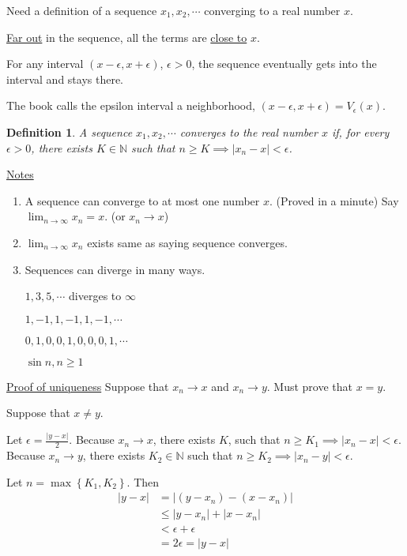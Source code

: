 \documentclass[12pt]{article}
\newtheorem*{definition}{Definition}
\begin{document}
Need a definition of a sequence $x_1, x_2, \cdots$ converging to a real number $x$.

\underline{Far out} in the sequence, all the terms are \underline{close to} $x$.

For any interval $(x - \epsilon, x + \epsilon)$, $\epsilon > 0$, the sequence eventually gets into the interval and stays there.

The book calls the epsilon interval a neighborhood, $\left(x - \epsilon, x + \epsilon \right) = V_\epsilon\left(x\right)$.

\begin{definition}
A sequence $x_1, x_2, \cdots$ converges to the real number $x$ if, for every $\epsilon > 0$, there exists $K \in \mathbb{N}$ such that $n \geq K \implies \left|x_n - x\right| < \epsilon$.
\end{definition}

\underline{Notes}
\begin{enumerate}
\item A sequence can converge to at most one number $x$. (Proved in a minute) Say $\lim_{n \to \infty} x_n = x$. (or $x_n \rightarrow x$)

\item $\lim_{n \to \infty} x_n$ exists same as saying sequence converges.

\item Sequences can diverge in many ways.

$1, 3, 5, \cdots$ diverges to $\infty$

$1, -1, 1, -1, 1, -1, \cdots$

$0, 1, 0, 0, 1, 0, 0, 0, 1, \cdots$

$\sin n, n \geq 1$
\end{enumerate}

\underline{Proof of uniqueness} Suppose that $x_n \to x$ and $x_n \rightarrow y$. Must prove that $x = y$.

Suppose that $x \neq y$.

Let $\epsilon = \frac{\left|y - x\right|}{2}$. Because $x_n \to x$, there exists $K$, such that $n \geq K_1 \implies \left|x_n - x\right| < \epsilon$. Because $x_n \to y$, there exists $K_2 \in \mathbb{N}$ such that $n \geq K_2 \implies \left|x_n - y\right| < \epsilon$.

Let $n = \max\left\{K_1, K_2\right\}$. Then
\begin{align*}
\left|y - x\right| &= \left|\left(y - x_n\right) - \left(x - x_n\right)\right| \\
&\leq \left|y - x_n \right| + \left|x - x_n\right| \\
&< \epsilon + \epsilon\\
&= 2\epsilon = \left|y - x\right|
\end{align*}
\end{document}
